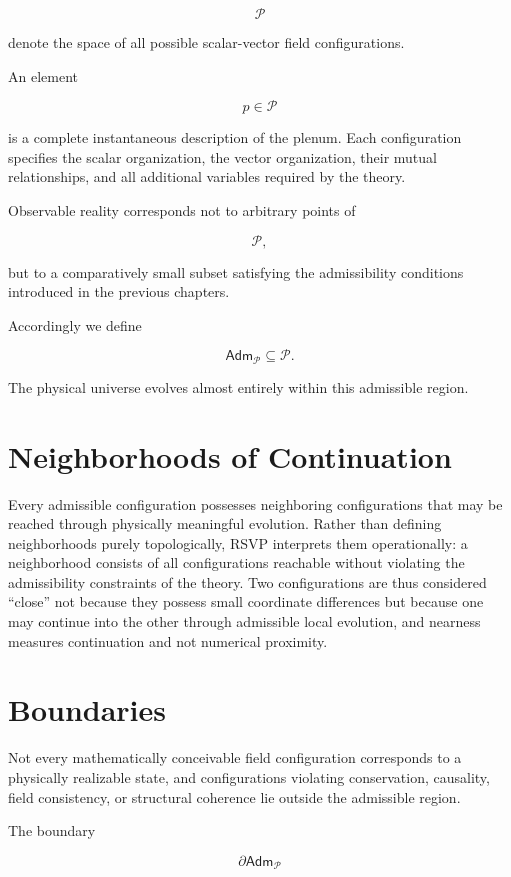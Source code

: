 \documentclass[11pt,oneside]{book}
\numberwithin{equation}{chapter}
\theoremstyle{definition}
\theoremstyle{plain}
\newcommand{\Adm}{\mathsf{Adm}}
\begin{document}
\[
\mathcal{P}
\]

denote the space of all possible scalar-vector field configurations.

An element

\[
p \in \mathcal{P}
\]

is a complete instantaneous description of the plenum. Each configuration specifies the scalar organization, the vector organization, their mutual relationships, and all additional variables required by the theory.

Observable reality corresponds not to arbitrary points of

\[
\mathcal{P},
\]

but to a comparatively small subset satisfying the admissibility conditions
introduced in the previous chapters.

Accordingly we define

\[
\Adm_{\mathcal P}
\subseteq
\mathcal P.
\]

The physical universe evolves almost entirely within this admissible region.

\section{Neighborhoods of Continuation}

Every admissible configuration possesses neighboring configurations that may be reached through physically meaningful evolution. Rather than defining neighborhoods purely topologically, RSVP interprets them operationally: a neighborhood consists of all configurations reachable without violating the admissibility constraints of the theory. Two configurations are thus considered ``close'' not because they possess small coordinate differences but because one may continue into the other through admissible local evolution, and nearness measures continuation and not numerical proximity.

\section{Boundaries}

Not every mathematically conceivable field configuration corresponds to a physically realizable state, and configurations violating conservation, causality, field consistency, or structural coherence lie outside the admissible region.

The boundary

\[
\partial\Adm_{\mathcal P}
\]
\end{document}
